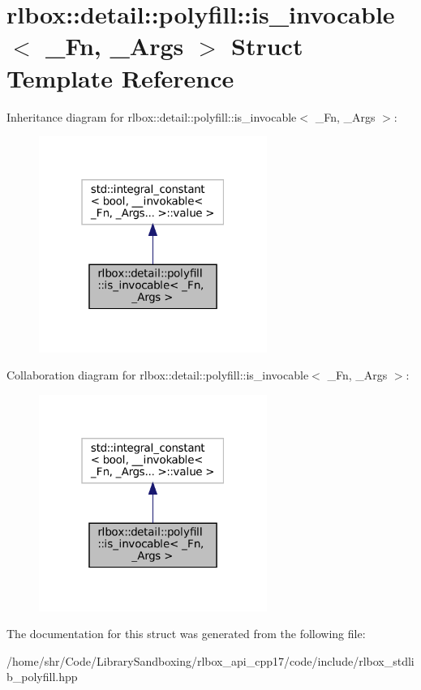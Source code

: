 \hypertarget{structrlbox_1_1detail_1_1polyfill_1_1is__invocable}{}\section{rlbox\+:\+:detail\+:\+:polyfill\+:\+:is\+\_\+invocable$<$ \+\_\+\+Fn, \+\_\+\+Args $>$ Struct Template Reference}
\label{structrlbox_1_1detail_1_1polyfill_1_1is__invocable}


Inheritance diagram for rlbox\+:\+:detail\+:\+:polyfill\+:\+:is\+\_\+invocable$<$ \+\_\+\+Fn, \+\_\+\+Args $>$\+:\nopagebreak
\begin{figure}[H]
\begin{center}
\leavevmode
\includegraphics[width=211pt]{structrlbox_1_1detail_1_1polyfill_1_1is__invocable__inherit__graph}
\end{center}
\end{figure}


Collaboration diagram for rlbox\+:\+:detail\+:\+:polyfill\+:\+:is\+\_\+invocable$<$ \+\_\+\+Fn, \+\_\+\+Args $>$\+:\nopagebreak
\begin{figure}[H]
\begin{center}
\leavevmode
\includegraphics[width=211pt]{structrlbox_1_1detail_1_1polyfill_1_1is__invocable__coll__graph}
\end{center}
\end{figure}


The documentation for this struct was generated from the following file\+:\begin{DoxyCompactItemize}
\item 
/home/shr/\+Code/\+Library\+Sandboxing/rlbox\+\_\+api\+\_\+cpp17/code/include/rlbox\+\_\+stdlib\+\_\+polyfill.\+hpp\end{DoxyCompactItemize}
